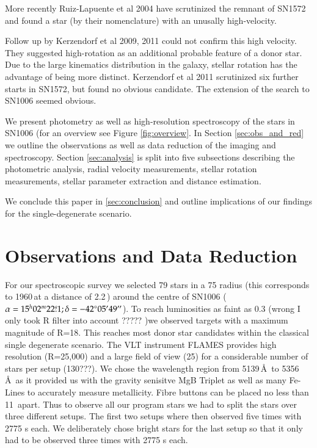 More recently Ruiz-Lapuente et al 2004 have scrutinized the remnant of SN1572 and found a star (\starg by their nomenclature) with an unusally high-velocity.

Follow up by Kerzendorf et al 2009, 2011 could not confirm this high velocity. They suggested high-rotation as an additional probable feature of a donor star. Due to the large kinematics distribution in the galaxy, stellar rotation has the advantage of being more distinct. 
Kerzendorf et al 2011 scrutinized six further starts in SN1572, but found no obvious candidate. The extension of the search to SN1006 seemed obvious.

We present photometry as well as high-resolution spectroscopy of the stars in SN1006 (for an overview see Figure \ref{fig:overview}. In Section \ref{sec:obs_and_red} we outline the observations as well as data reduction of the imaging and spectroscopy. Section \ref{sec:analysis} is split into five subsections describing the photometric analysis, radial velocity measurements, stellar rotation measurements, stellar parameter extraction and distance estimation.

We conclude this paper in \ref{sec:conclusion} and outline implications of our findings for the single-degenerate scenario.


\section{Observations and Data Reduction}

For our spectroscopic survey we selected 79 stars in a 75 \arcsec radius (this corresponds to 1960\,\kms at a distance of 2.2\,\kpc) around the centre of SN1006 ($\alpha = 15^h02^m22\overset{s}{.}1;\delta = -42^{\circ}05\hbox{$^\prime$}49\hbox{$^{\prime\prime}$}$). To reach luminosities as faint as 0.3 \lsun (wrong I only took R filter into account ????? )we observed targets with a maximum magnitude of R=18. This reaches most donor star candidates within the classical single degenerate scenario. 
The VLT instrument FLAMES provides high resolution (R=25,000) and a large field of view (25\arcmin) for a considerable number of stars per setup (130???). We chose the wavelength region from 5139\,\AA\ to 5356\,\AA\ as it provided us with the gravity senisitve MgB Triplet as well as many Fe-Lines to accurately measure metallicity. Fibre buttons can be placed no less than 11\arcsec\ apart. Thus to observe all our program stars we had to split the stars over three different setups. The first two setups where then observed five times with 2775 s each. We deliberately chose bright stars for the last setup so that it only had to be observed three times with 2775 s each.  


